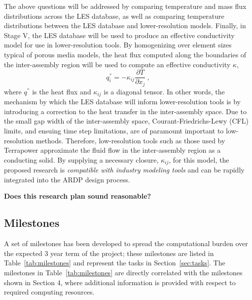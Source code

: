 The above questions will be addressed by comparing temperature and mass flux
distributions across the LES database, as well as comparing temperature
distributions between the LES database and lower-resolution models. Finally, in
Stage V, the LES database will be used to produce an effective conductivity
model for use in lower-resolution tools. By homogenizing over element sizes
typical of porous media models, the heat flux computed along the boundaries of
the inter-assembly region will be used to compute an effective conductivity
\(\kappa\),
\begin{equation}
q_i^{''}=-\kappa_{ij}\frac{\partial T}{\partial x_j}\ ,
\end{equation}
where \(q^{''}\) is the heat flux and \(\kappa_{ij}\) is a diagonal tensor. In other words, the mechanism by which the LES database will inform lower-resolution tools is by introducing a correction to the heat transfer in the inter-assembly space. Due to the small gap width of the inter-assembly space, Courant-Friedrichs-Lewy (CFL) limits, and ensuing time step limitations, are of paramount important to low-resolution methods. Therefore, low-resolution tools such as those used by Terrapower \cite{touran} approximate the fluid flow in the inter-assembly region as a conducting solid. By supplying a necessary closure, \(\kappa_{ij}\), for this model, the proposed research is {\it compatible with industry modeling tools} and can be rapidly integrated into the ARDP design process.

{\bf Does this research plan sound reasonable?}


\vspace{-.25in}
\subsection{Milestones}
\vspace{-.2in}


A set of milestones has been developed to spread the computational burden over
the expected 3 year term of the project; these milestones are listed in Table~\ref{tab:milestones} and represent the tasks
in Section~\ref{sec:tasks}. The milestones in Table~\ref{tab:milestones} are directly correlated
with the milestones shown in Section 4, where additional information is provided with respect
to required computing resources.

